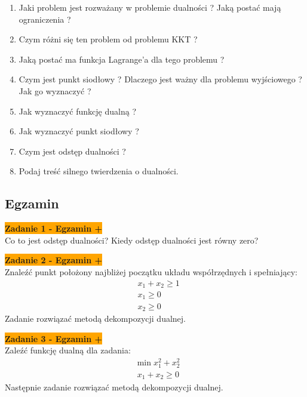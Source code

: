 \documentclass[a4paper,11pt]{article}
\begin{document}
\begin{enumerate}

\item Jaki problem jest rozważany w problemie dualności ? Jaką postać mają ograniczenia ?
\item Czym różni się ten problem od problemu KKT ?
\item Jaką postać ma funkcja Lagrange'a dla tego problemu ?
\item Czym jest punkt siodłowy ? Dlaczego jest ważny dla problemu wyjściowego ? Jak go wyznaczyć ?
\item Jak wyznaczyć funkcję dualną ?
\item Jak wyznaczyć punkt siodłowy ?
\item Czym jest odstęp dualności ?
\item Podaj treść silnego twierdzenia o dualności.


\end{enumerate}


\subsection{Egzamin}

\begin{framed}
\textbf{\colorbox{orange}{Zadanie 1 - Egzamin + }} \\
Co to jest odstęp  dualności? Kiedy odstęp dualności   jest równy zero? 
\end{framed}

\begin{framed}
\textbf{\colorbox{orange}{Zadanie 2 - Egzamin + }} \\
Znaleźć punkt położony najbliżej początku układu współrzędnych i spełniający:
\begin{align*}
& x_1+x_2 \geq 1 \\
& x_1 \geq 0 \\
& x_2 \geq 0
\end{align*}
Zadanie rozwiązać metodą dekompozycji dualnej. 
\end{framed}

\begin{framed}
\textbf{\colorbox{orange}{Zadanie 3 - Egzamin +}} \\
Zaleźć funkcję dualną dla zadania:
\begin{align*}
&\text{min} \; x_1^2+x_2^2 \\
&x_1+x_2 \geq 0 
\end{align*}
Następnie zadanie rozwiązać metodą dekompozycji dualnej. 
\end{framed}
\end{document}
